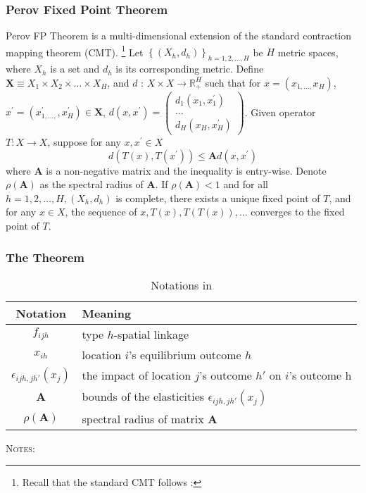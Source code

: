 \subsubsection{Perov Fixed Point Theorem}%
Perov FP Theorem is a multi-dimensional extension of the standard contraction mapping theorem (CMT).%
\footnote{
    Recall that the standard CMT follows \citep{Stokey:1989}:
}
Let $\left\{\left(X_h, d_h\right)\right\}_{h=1,2, \ldots, H}$ be $H$ metric spaces, 
where $X_h$ is a set and $d_h$ is its corresponding metric. 
Define $\mathbf{X} \equiv X_1 \times X_2 \times \ldots \times X_H$, 
and $d$ : $X \times X \rightarrow \mathbb{R}_{+}^H$ such that 
for $x=\left(x_{1, \ldots,} x_H\right)$, 
$x^{\prime}=\left(x_{1, \ldots,}^{\prime}, x_H^{\prime}\right) \in \mathbf{X}$, 
$d\left(x, x^{\prime}\right)=\left(\begin{array}{c}d_1\left(x_1, x_1^{\prime}\right) \\ \ldots \\ d_H\left(x_H, x_H^{\prime}\right)\end{array}\right)$. 
Given operator $T: X \rightarrow X$, suppose for any $x, x^{\prime} \in X$
$$
d\left(T(x), T\left(x^{\prime}\right)\right) \leq \mathbf{A} d\left(x, x^{\prime}\right)
$$
where $\mathbf{A}$ is a non-negative matrix and the inequality is entry-wise. 
Denote $\rho \mathbf{( \mathbf { A } )}$ as the spectral radius of $\mathbf{A}$. If $\rho(\mathbf{A})<1$ 
and for all $h=1,2, \ldots, H,\left(X_h, d_h\right)$ is complete, 
there exists a unique fixed point of $T$, 
and for any $x \in X$, the sequence of $x, T(x), T(T(x)), \ldots$ 
converges to the fixed point of $T$.

\subsubsection{The Theorem}

\begin{table}[h]
    \caption{Notations in \cite{Allen:2024}}
        \centering
        \begin{tabular}{c l} \toprule
            Notation & Meaning \\ \hline
            $f_{ijh}$ & type $h$-spatial linkage \\
            $x_{ih}$ & location $i$'s equilibrium outcome $h$ \\
            $\epsilon_{ijh,jh'}(x_{j})$ & the impact of location $j$'s outcome $h'$ on $i$'s outcome h \\
            $\mathbf{A}$ & bounds of the elasticities $\epsilon_{ijh,jh'}(x_{j})$ \\
            $\rho(\mathbf{A})$ & spectral radius of matrix $\mathbf{A}$ \\
            \bottomrule
        \end{tabular}
        \begin{minipage}{0.6\textwidth}{\footnotesize
            \textsc{Notes}:}
        \end{minipage}
\end{table}

